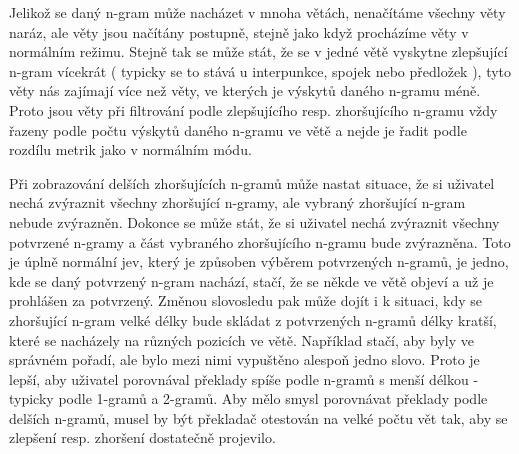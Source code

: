 Jelikož se daný n-gram může nacházet v mnoha větách,
  nenačítáme všechny věty naráz,
  ale věty jsou načítány postupně,
  stejně jako když procházíme věty v normálním režimu.
Stejně tak se může stát,
  že se v jedné větě vyskytne zlepšující n-gram vícekrát
  ( typicky se to stává u interpunkce, spojek nebo předložek ),
  tyto věty nás zajímají více než věty,
  ve kterých je výskytů daného n-gramu méně.
Proto jsou věty při filtrování podle zlepšujícího resp. zhoršujícího n-gramu vždy řazeny podle počtu výskytů daného n-gramu ve větě
  a nejde je řadit podle rozdílu metrik jako v normálním módu.

Při zobrazování delších zhoršujících n-gramů může nastat situace,
  že si uživatel nechá zvýraznit všechny zhoršující n-gramy,
  ale vybraný zhoršující n-gram nebude zvýrazněn.
Dokonce se může stát, 
  že si uživatel nechá zvýraznit všechny potvrzené n-gramy
  a část vybraného zhoršujícího n-gramu bude zvýrazněna.
Toto je úplně normální jev,
  který je způsoben výběrem potvrzených n-gramů,
  je jedno, kde se daný potvrzený n-gram nachází,
  stačí,
  že se někde ve větě objeví a už je prohlášen za potvrzený.
Změnou slovosledu pak může dojít i k situaci,
  kdy se zhoršující n-gram velké délky bude skládat z potvrzených n-gramů délky kratší,
  které se nacházely na různých pozicích ve větě. 
Například stačí, aby byly ve správném pořadí,
  ale bylo mezi nimi vypuštěno alespoň jedno slovo.
Proto je lepší,
  aby uživatel porovnával překlady spíše podle n-gramů s menší délkou -
  typicky podle 1-gramů a 2-gramů.
Aby mělo smysl porovnávat překlady podle delších n-gramů,
  musel by být překladač otestován na velké počtu vět tak,
  aby se zlepšení resp. zhoršení dostatečně projevilo.

